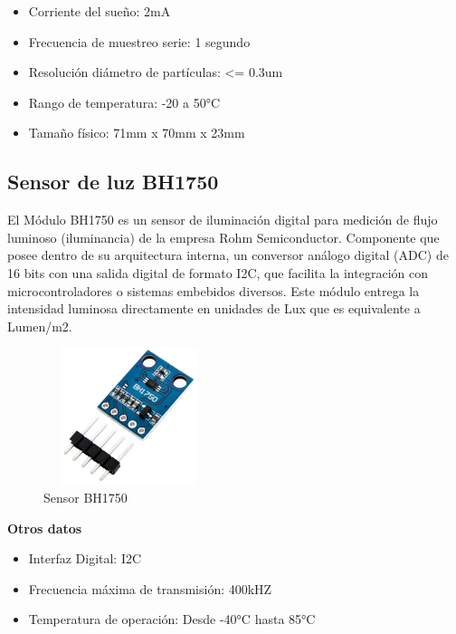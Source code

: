 \begin{itemize}
    \item Corriente del sueño: 2mA
    \item Frecuencia de muestreo serie: 1 segundo
    \item Resolución diámetro de partículas: <= 0.3um
    \item Rango de temperatura: -20 a 50°C
    \item Tamaño físico: 71mm x 70mm x 23mm 
\end{itemize}

\vspace{5cm}

\subsection{Sensor de luz BH1750}

El Módulo BH1750 es un sensor de iluminación digital para medición de flujo luminoso (iluminancia) de la empresa Rohm Semiconductor. Componente que posee dentro de su arquitectura interna, un conversor análogo digital (ADC) de 16 bits con una salida digital de formato I2C, que facilita la integración con microcontroladores o sistemas embebidos diversos. Este módulo entrega la intensidad luminosa directamente en unidades de Lux que es equivalente a Lumen/m2.\\

\begin{figure}[H]
    \centering
    \includegraphics[width=5cm, height=4cm]{imagenes/Sensor BH1750.jpg}
    \caption{Sensor BH1750}
    \label{imag:BH1750}
 \end{figure}

\textbf{Otros datos}

\begin{itemize}
    \item Interfaz Digital: I2C
    \item Frecuencia máxima de transmisión: 400kHZ
    \item Temperatura de operación: Desde -40°C hasta 85°C
\end{itemize}

